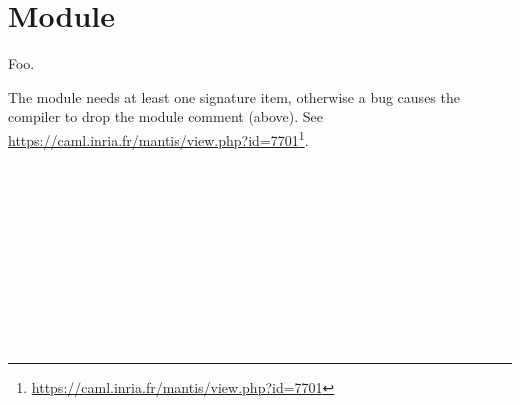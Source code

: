 \section{Module }\label{Module}%
Foo.

\label{Module--val-foo}\begin{ocamlindent}The module needs at least one signature item, otherwise a bug causes the compiler to drop the module comment (above). See \href{https://caml.inria.fr/mantis/view.php?id=7701}{https://caml.inria.fr/mantis/view.php?id=7701}\footnote{\url{https://caml.inria.fr/mantis/view.php?id=7701}}.\end{ocamlindent}%
\medbreak
\label{Module--module-type-S}\label{Module-module-type-S}\begin{ocamlindent}\label{Module-module-type-S--type-t}\\
\label{Module-module-type-S--type-u}\\
\label{Module-module-type-S--type-v}\\
\label{Module-module-type-S--type-w}\\
\label{Module-module-type-S--module-M}\label{Module-module-type-S-M}\begin{ocamlindent}\end{ocamlindent}%
\\
\end{ocamlindent}%
\\
\label{Module--module-type-S1}\\
\label{Module--module-type-S2}\\
